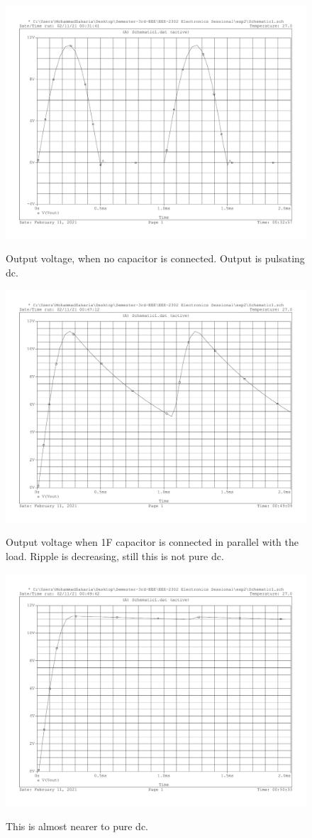 \documentclass{article}
\begin{document}
\begin{figure}[!htb]
	\centering
	\includegraphics[width=0.7\linewidth]{Vout1}
	\caption{}
	\label{fig:vout1} Output voltage, when no capacitor is connected. Output is pulsating dc.
\end{figure}

\begin{figure}[!htb]
	\centering
	\includegraphics[width=0.7\linewidth]{Vout-for-1UFD-capacitor}
	\caption{}
	\label{fig:vout-for-1ufd-capacitor} Output voltage when 1\textmu F capacitor is connected in parallel with the load. Ripple is decreasing, still this is not pure dc.
\end{figure}
	
\begin{figure}[!htb]
	\centering
	\includegraphics[width=0.7\linewidth]{Vout-for-47UFD}
	\caption{}
	\label{fig:vout-for-47ufd} This is almost nearer to pure dc.
\end{figure}
\end{document}
